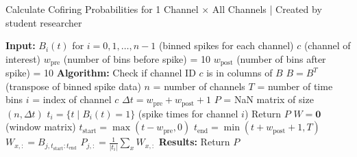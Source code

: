 \documentclass{article} %
\begin{document}
\begin{singlespace}
    \begin{algorithm}
    \caption{Calculate Cofiring Probabilities for 1 Channel \(\times\) All Channels | Created by student researcher}
        \begin{algorithmic}[1]
            \State \textbf{Input:}
            \State  $B_{i}(t)$ for $i = 0, 1, \ldots, n-1$ (binned spikes for each channel)
            \State  $c$ (channel of interest)
            \State  $w_{\text{pre}}$ (number of bins before spike) = 10
            \State  $w_{\text{post}}$ (number of bins after spike) = 10
            \State
            \State \textbf{Algorithm:}
            \State  Check if channel ID $c$ is in columns of $B$
            \State  $B = B^T$ (transpose of binned spike data)
            \State  $n$ = number of channels
            \State  $T$ = number of time bins
            \State  $i$ = index of channel $c$
            \State  $\Delta t = w_{\text{pre}} + w_{\text{post}} + 1$
            \State  $P$ = NaN matrix of size $(n, \Delta t)$
            \State  $t_i = \{t \mid B_i(t) = 1\}$ (spike times for channel $i$)
                \State Return $P$
            \EndIf
                \State $W = \mathbf{0}$ (window matrix)
                    \State $t_{\text{start}} = \max(t - w_{\text{pre}}, 0)$
                    \State $t_{\text{end}} = \min(t + w_{\text{post}} + 1, T)$
                    \State $W_{x, :} = B_{j, t_{\text{start}}:t_{\text{end}}}$
                \EndFor
                \State $P_{j, :} = \frac{1}{|t_i|} \sum_{x} W_{x, :}$
            \EndFor
            \State
            \State \textbf{Results:}
            \State  Return $P$
        \end{algorithmic}
    \end{algorithm}
\end{singlespace}
\end{document}
